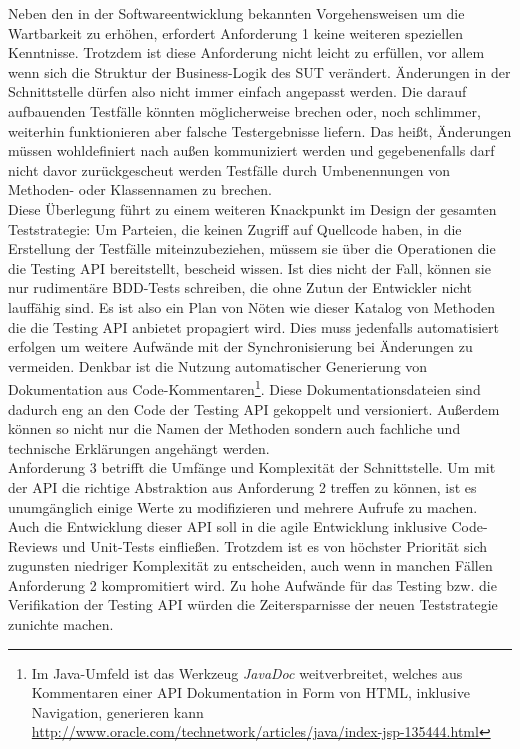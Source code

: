 Neben den in der Softwareentwicklung bekannten Vorgehensweisen um die  Wartbarkeit zu erhöhen, erfordert Anforderung 1 keine weiteren speziellen Kenntnisse. Trotzdem ist diese Anforderung nicht leicht zu erfüllen, vor allem wenn sich die Struktur der Business-Logik des \Gls{SUT} verändert. Änderungen in der Schnittstelle dürfen also nicht immer einfach angepasst werden. Die darauf aufbauenden Testfälle könnten möglicherweise brechen oder, noch schlimmer, weiterhin funktionieren aber falsche Testergebnisse liefern. Das heißt, Änderungen müssen wohldefiniert nach außen kommuniziert werden und gegebenenfalls darf nicht davor zurückgescheut werden Testfälle durch Umbenennungen von Methoden- oder Klassennamen zu brechen.\\
Diese Überlegung führt zu einem weiteren Knackpunkt im Design der gesamten Teststrategie: Um Parteien, die keinen Zugriff auf Quellcode haben, in die Erstellung der Testfälle miteinzubeziehen, müssem sie über die Operationen die die Testing API bereitstellt, bescheid wissen. Ist dies nicht der Fall, können sie nur rudimentäre BDD-Tests schreiben, die ohne Zutun der Entwickler nicht lauffähig sind. Es ist also ein Plan von Nöten wie dieser Katalog von Methoden die die Testing API anbietet propagiert wird. Dies muss jedenfalls automatisiert erfolgen um weitere Aufwände mit der Synchronisierung bei Änderungen zu vermeiden. Denkbar ist die Nutzung automatischer Generierung von Dokumentation aus Code-Kommentaren\footnote{Im Java-Umfeld ist das Werkzeug \textit{JavaDoc} weitverbreitet, welches aus Kommentaren einer API Dokumentation in Form von HTML, inklusive Navigation, generieren kann \url{http://www.oracle.com/technetwork/articles/java/index-jsp-135444.html}}. Diese Dokumentationsdateien sind dadurch eng an den Code der Testing API gekoppelt und versioniert. Außerdem können so nicht nur die Namen der Methoden sondern auch fachliche und technische Erklärungen angehängt werden.\\
Anforderung 3 betrifft die Umfänge und Komplexität der Schnittstelle. Um mit der API die richtige Abstraktion aus Anforderung 2 treffen zu können, ist es unumgänglich einige Werte zu modifizieren und mehrere Aufrufe zu machen. Auch die Entwicklung dieser API soll in die agile Entwicklung inklusive Code-Reviews und Unit-Tests einfließen. Trotzdem ist es von höchster Priorität sich zugunsten niedriger Komplexität zu entscheiden, auch wenn in manchen Fällen Anforderung 2 kompromitiert wird. Zu hohe Aufwände für das Testing bzw. die Verifikation der Testing API würden die Zeitersparnisse der neuen Teststrategie zunichte machen.

